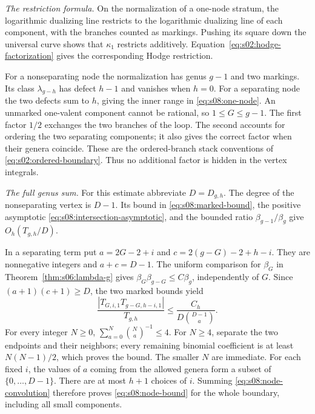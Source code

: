 \begin{prf}
\emph{The restriction formula.}
On the normalization of a one-node stratum, the logarithmic
dualizing line restricts to the logarithmic dualizing line of each
component, with the branches counted as markings. Pushing its
square down the universal curve shows that $\kappa_1$ restricts
additively. Equation~\eqref{eq:s02:hodge-factorization} gives the
corresponding Hodge restriction.

For a nonseparating node the normalization has genus $g-1$ and two
markings. Its class $\lambda_{g-h}$ has defect $h-1$ and vanishes
when $h=0$. For a separating node the two defects sum to $h$,
giving the inner range in \eqref{eq:s08:one-node}. An unmarked
one-valent component cannot be rational, so $1\leq G\leq g-1$.
The first factor $1/2$ exchanges the two branches of the loop.
The second accounts for ordering the two separating components;
it also gives the correct factor when their genera coincide.
These are the ordered-branch stack conventions of
\eqref{eq:s02:ordered-boundary}. Thus no additional factor is
hidden in the vertex integrals.

\smallskip\noindent
\emph{The full genus sum.}
For this estimate abbreviate $D=D_{g,h}$. The degree of the
nonseparating vertex is $D-1$. Its bound in
\eqref{eq:s08:marked-bound}, the positive asymptotic
\eqref{eq:s08:intersection-asymptotic}, and the bounded ratio
$\beta_{g-1}/\beta_g$ give $O_h(T_{g,h}/D)$.

In a separating term put
$a=2G-2+i$ and $c=2(g-G)-2+h-i$. They are nonnegative integers
and $a+c=D-1$. The uniform comparison for $\beta_G$ in
Theorem~\ref{thm:s06:lambda-g} gives
$\beta_G\beta_{g-G}\leq C\beta_g$, independently of $G$.
Since $(a+1)(c+1)\geq D$, the two marked bounds yield
\begin{equation}\label{eq:s08:node-convolution}
 \frac{|T_{G,i,1}T_{g-G,h-i,1}|}{T_{g,h}}
 \leq \frac{C_h}{D\binom{D-1}{a}}.
\end{equation}
For every integer $N\geq0$,
$\sum_{a=0}^N\binom Na^{-1}\leq4$. For $N\geq4$, separate
the two endpoints and their neighbors; every remaining binomial
coefficient is at least $N(N-1)/2$, which proves the bound.
The smaller $N$ are immediate. For each fixed $i$, the values of
$a$ coming from the allowed genera form a subset of
$\{0,\ldots,D-1\}$. There are at most $h+1$ choices of $i$.
Summing \eqref{eq:s08:node-convolution} therefore proves
\eqref{eq:s08:node-bound} for the whole boundary, including all
small components.
\end{prf}

